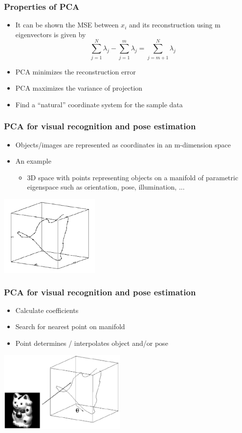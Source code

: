 \documentclass[10pt]{beamer}
\begin{document}
\begin{frame}
  \frametitle{Properties of PCA}
  \begin{itemize}
  \item It can be shown the MSE between $x_i$ and its reconstruction
    using m eigenvectors is given by
    \[
      \sum_{j=1}^N \lambda_j - \sum_{j=1}^m \lambda_j = \sum_{j=m+1}^N \lambda_j
    \]
  \item PCA minimizes the reconstruction error
  \item PCA maximizes the variance of projection
  \item Find a ``natural'' coordinate system for the sample data
  \end{itemize}
\end{frame}

\begin{frame}
  \frametitle{PCA for visual recognition and pose estimation}
  \begin{itemize}
  \item Objects/images are represented as coordinates in an m-dimension space
  \item An example
    \begin{itemize}
    \item 3D space with points representing objects on a manifold of
      parametric eigenspace such as orientation, pose, illumination,
      ...
    \end{itemize}
  \end{itemize}
  \centerline{\includegraphics[height=4cm]{pca-eigen-manifold}}
\end{frame}

\begin{frame}
  \frametitle{PCA for visual recognition and pose estimation}
  \begin{itemize}
  \item Calculate coefficients
  \item Search for nearest point on manifold
  \item Point determines / interpolates object and/or pose
  \end{itemize}
  \centerline{\includegraphics[height=4cm]{pca-manifold-sample}}
\end{frame}
\end{document}
